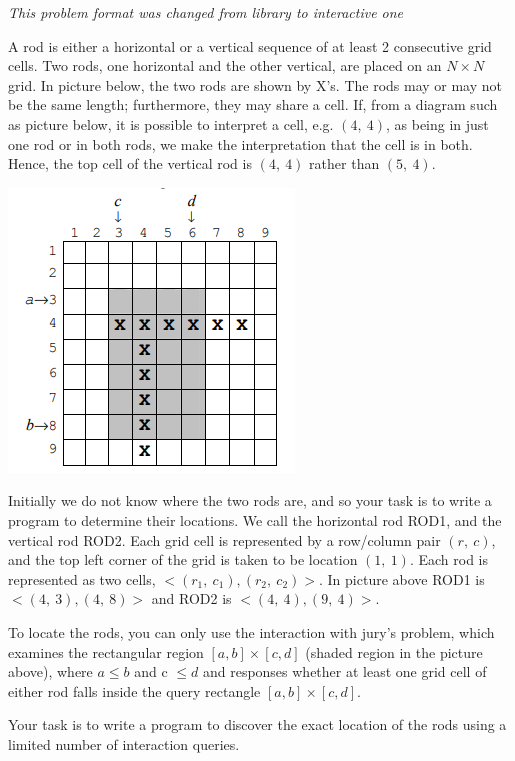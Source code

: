 {\it This problem format was changed from library to interactive one }

A rod is either a horizontal or a vertical sequence of at least 2 consecutive grid cells.
Two rods, one horizontal and the other vertical, are placed on an $N \times N$ grid. In
picture below, the two rods are shown by X's. The rods may or may not be the same length;
furthermore, they may share a cell. If, from a diagram such as picture below, it is possible to interpret a cell, e.g. $(4,~4)$, as being in just one rod or in both rods, we make the interpretation that the cell is in both. Hence, the top cell of the vertical rod is $(4,~4)$ rather than $(5,~4)$.

\includegraphics{pic.png}


Initially we do not know where the two rods are, and so your task is to write a program
to determine their locations. We call the horizontal rod ROD1, and the vertical rod
ROD2. Each grid cell is represented by a row/column pair $(r,~c)$, and the top left corner
of the grid is taken to be location $(1,~1)$. Each rod is represented as two cells, $<(r_1,~c_1), (r_2,~c_2)>$. In picture above ROD1 is $<(4,~3), (4,~8)>$ and ROD2 is $<(4,~4), (9,~4)>$.

To locate the rods, you can only use the interaction with jury's problem, which examines the rectangular region $[a,b]\times[c,d]$ (shaded region in the picture above), where $a \le b$ and c $\le d$ and responses whether at least one grid cell of either rod falls inside the query rectangle $[a,b]\times[c,d]$.

Your task is to write a program to discover the exact location of the rods using a limited number of interaction queries.
